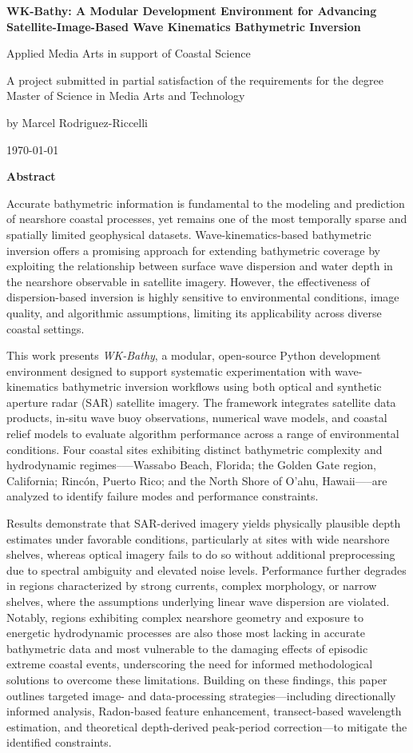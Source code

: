 \documentclass[12pt]{article}
\newcommand{\papertitle}{WK-Bathy: A Modular Development Environment for Advancing Satellite-Image-Based Wave Kinematics Bathymetric Inversion}
\newcommand{\papersubtitle}{Applied Media Arts in support of Coastal Science}
\newcommand{\papercourse}{A project submitted in partial satisfaction of the requirements for the degree Master of Science in Media Arts and Technology}
\newcommand{\paperauthor}{Marcel Rodriguez-Riccelli}
\newcommand{\paperdate}{\today}
\newcommand{\makepapertitle}{
  \begin{center}
    {\Large\bfseries \papertitle\par}
    \vspace{0.35cm}
    {\large \papersubtitle\par}
    \vspace{0.6cm}
    {\papercourse\par}
    \vspace{0.4cm}
    {by \paperauthor\par}
    \vspace{0.3cm}
    {\paperdate\par}
  \end{center}
  \vspace{0.8cm}
}
\begin{document}
\onehalfspacing

\makepapertitle

\thispagestyle{empty}
{\Large\bfseries Abstract}

Accurate bathymetric information is fundamental to the modeling and prediction of nearshore coastal processes, yet remains one of the most temporally sparse and spatially limited geophysical datasets. Wave-kinematics-based bathymetric inversion offers a promising approach for extending bathymetric coverage by exploiting the relationship between surface wave dispersion and water depth in the nearshore observable in satellite imagery. However, the effectiveness of dispersion-based inversion is highly sensitive to environmental conditions, image quality, and algorithmic assumptions, limiting its applicability across diverse coastal settings.

This work presents \textit{WK-Bathy}, a modular, open-source Python development environment designed to support systematic experimentation with wave-kinematics bathymetric inversion workflows using both optical and synthetic aperture radar (SAR) satellite imagery. The framework integrates satellite data products, in-situ wave buoy observations, numerical wave models, and coastal relief models to evaluate algorithm performance across a range of environmental conditions. Four coastal sites exhibiting distinct bathymetric complexity and hydrodynamic regimes--—Wassabo Beach, Florida; the Golden Gate region, California; Rincón, Puerto Rico; and the North Shore of O'ahu, Hawaii—--are analyzed to identify failure modes and performance constraints.

Results demonstrate that SAR-derived imagery yields physically plausible depth estimates under favorable conditions, particularly at sites with wide nearshore shelves, whereas optical imagery fails to do so without additional preprocessing due to spectral ambiguity and elevated noise levels. Performance further degrades in regions characterized by strong currents, complex morphology, or narrow shelves, where the assumptions underlying linear wave dispersion are violated. Notably, regions exhibiting complex nearshore geometry and exposure to energetic hydrodynamic processes are also those most lacking in accurate bathymetric data and most vulnerable to the damaging effects of episodic extreme coastal events, underscoring the need for informed methodological solutions to overcome these limitations. Building on these findings, this paper outlines targeted image- and data-processing strategies—including directionally informed analysis, Radon-based feature enhancement, transect-based wavelength estimation, and theoretical depth-derived peak-period correction—to mitigate the identified constraints.
\end{document}
